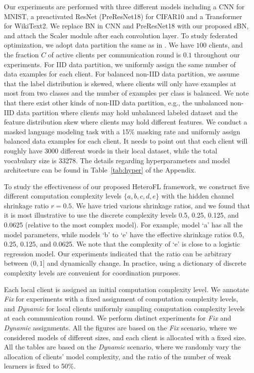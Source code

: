 \documentclass{article} %
\begin{document}
Our experiments are performed with three different models including a CNN for MNIST, a preactivated ResNet (PreResNet18) \citep{he2016identity} for CIFAR10 and a Transformer \citep{vaswani2017attention} for WikiText2. We replace BN in CNN and PreResNet18 with our proposed sBN, and attach the Scaler module after each convolution layer. To study federated optimization, we adopt data partition the same as in \citep{mcmahan2017communication,liang2020think}. We have $100$ clients, and the fraction $C$ of active clients per communication round is $0.1$ throughout our experiments. For IID data partition, we uniformly assign the same number of data examples for each client. For balanced non-IID data partition, we assume that the label distribution is skewed, where clients will only have examples at most from two classes and the number of examples per class is balanced. We note that there exist other kinds of non-IID data partition, e.g., the unbalanced non-IID data partition where clients may hold unbalanced labeled dataset and the feature distribution skew where clients may hold different features. We conduct a masked language modeling task with a 15\% masking rate and uniformly assign balanced data examples for each client. It needs to point out that each client will roughly have 3000 different words in their local dataset, while the total vocabulary size is 33278. The details regarding hyperparameters and model architecture can be found in Table~\ref{tab:hyper} of the Appendix. 

To study the effectiveness of our proposed HeteroFL framework, we construct five different computation complexity levels $\{a,b,c,d,e\}$ with the hidden channel shrinkage ratio $r=0.5$. 
We have tried various shrinkage ratios, and we found that it is most illustrative to use the discrete complexity levels 0.5, 0.25, 0.125, and 0.0625 (relative to the most complex model).  For example, model `a' has all the model parameters, while models `b' to `e' have the effective shrinkage ratios 0.5, 0.25, 0.125, and 0.0625. We note that the complexity of `e' is close to a logistic regression model. Our experiments indicated that the ratio can be arbitrary between $(0, 1]$ and dynamically change. In practice, using a dictionary of discrete complexity levels are convenient for coordination purposes.

Each local client is assigned an initial computation complexity level. We annotate \textit{Fix} for experiments with a fixed assignment of computation complexity levels, and \textit{Dynamic} for local clients uniformly sampling computation complexity levels at each communication round. We perform distinct experiments for \textit{Fix} and \textit{Dynamic} assignments. All the figures are based on the \textit{Fix} scenario, where we considered models of different sizes, and each client is allocated with a fixed size. All the tables are based on the \textit{Dynamic} scenario, where we randomly vary the allocation of clients' model complexity, and the ratio of the number of weak learners is fixed to 50\%.
\end{document}
